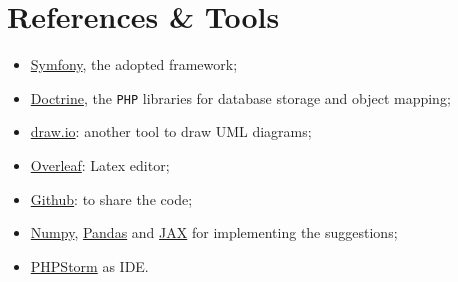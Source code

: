 \documentclass{article}
\begin{document}
\section{References \& Tools}
\begin{itemize}
    \item \href{https://symfony.com/}{Symfony}, the adopted framework;
    \item \href{https://www.doctrine-project.org/}{Doctrine}, the \verb|PHP| libraries for database storage and object mapping;
    \item \href{https://app.diagrams.net/}{draw.io}: another tool to draw UML diagrams;
    \item \href{https://www.overleaf.com}{Overleaf}: Latex editor;
    \item \href{https://github.com/}{Github}: to share the code;
    \item \href{https://numpy.org/}{Numpy}, \href{https://pandas.pydata.org/}{Pandas} and \href{https://github.com/google/jax}{JAX} for implementing the suggestions;
    \item \href{https://www.jetbrains.com/phpstorm/}{PHPStorm} as IDE.
\end{itemize}
\end{document}
